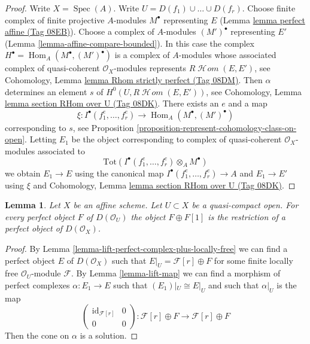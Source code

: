 \documentclass{amsart}
\theoremstyle{plain}
\newtheorem{lemma}[subsection]{Lemma}
\theoremstyle{definition}
\theoremstyle{remark}
\numberwithin{equation}{subsection}
\def\Spec{\mathop{\mathrm{Spec}}}
\def\Hom{\mathop{\mathrm{Hom}}\nolimits}
\def\SheafHom{\mathop{\mathcal{H}\!\mathit{om}}\nolimits}
\begin{document}
\begin{proof}
Write $X = \Spec(A)$. Write $U = D(f_1) \cup \ldots \cup D(f_r)$. Choose
finite complex of finite projective $A$-modules $M^\bullet$ representing
$E$ (Lemma \href{https://stacks.math.columbia.edu/tag/08EB}{lemma perfect affine (Tag 08EB)}). Choose a complex of $A$-modules
$(M')^\bullet$ representing $E'$ (Lemma \ref{lemma-affine-compare-bounded}).
In this case the complex $H^\bullet = \Hom_A(M^\bullet, (M')^\bullet)$
is a complex of $A$-modules whose associated complex of quasi-coherent
$\mathcal{O}_X$-modules represents $R\SheafHom(E, E')$, see
Cohomology, Lemma \href{https://stacks.math.columbia.edu/tag/08DM}{lemma Rhom strictly perfect (Tag 08DM)}.
Then $\alpha$ determines an element $s$ of $H^0(U, R\SheafHom(E, E'))$, see
Cohomology, Lemma \href{https://stacks.math.columbia.edu/tag/08DK}{lemma section RHom over U (Tag 08DK)}.
There exists an $e$ and a map
$$
\xi : I^\bullet(f_1^e, \ldots, f_r^e) \to \Hom_A(M^\bullet, (M')^\bullet)
$$
corresponding to $s$, see
Proposition \ref{proposition-represent-cohomology-class-on-open}.
Letting $E_1$ be the object corresponding to
complex of quasi-coherent $\mathcal{O}_X$-modules
associated to
$$
\text{Tot}(I^\bullet(f_1^e, \ldots, f_r^e) \otimes_A M^\bullet)
$$
we obtain $E_1 \to E$ using the canonical map
$I^\bullet(f_1^e, \ldots, f_r^e) \to A$ and $E_1 \to E'$
using $\xi$ and
Cohomology, Lemma \href{https://stacks.math.columbia.edu/tag/08DK}{lemma section RHom over U (Tag 08DK)}.
\end{proof}


\begin{lemma}
\label{lemma-lift-perfect-complex-plus-shift}
Let $X$ be an affine scheme. Let $U \subset X$ be a quasi-compact open.
For every perfect object $F$ of $D(\mathcal{O}_U)$
the object $F \oplus F[1]$ is the restriction of
a perfect object of $D(\mathcal{O}_X)$.
\end{lemma}

\begin{proof}
By Lemma \ref{lemma-lift-perfect-complex-plus-locally-free}
we can find a perfect object $E$ of $D(\mathcal{O}_X)$
such that $E|_U = \mathcal{F}[r] \oplus F$ for some finite locally
free $\mathcal{O}_U$-module $\mathcal{F}$.
By Lemma \ref{lemma-lift-map} we can find a morphism of
perfect complexes $\alpha : E_1 \to E$ such that $(E_1)|_U \cong E|_U$
and such that $\alpha|_U$ is the map
$$
\left(
\begin{matrix}
\text{id}_{\mathcal{F}[r]} & 0 \\
0 & 0
\end{matrix}
\right)
:
\mathcal{F}[r] \oplus F \to \mathcal{F}[r] \oplus F
$$
Then the cone on $\alpha$ is a solution.
\end{proof}
\end{document}
